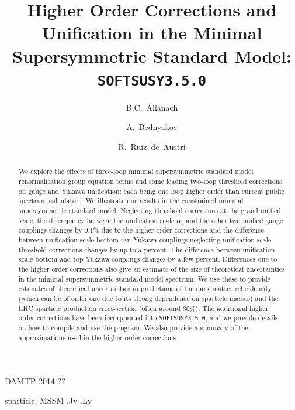\documentclass[final,3p,times,pdflatex]{elsarticle}
\begin{document}
\begin{frontmatter}

\begin{flushright}
DAMTP-2014-??
\end{flushright}

\title{Higher Order Corrections and Unification in
  the Minimal Supersymmetric Standard Model: {\tt SOFTSUSY3.5.0}}

\author[damtp]{B.C.~Allanach}
\author[dubna]{A.~Bednyakov}
\author[valencia]{R.~Ruiz~de~Austri}

\address[damtp]{DAMTP, CMS, University of Cambridge, Wilberforce road,
  Cambridge, CB3  0WA, United Kingdom}
\address[dubna]{Joint Institute for Nuclear Research, 141980, Dubna, Russia}
\address[valencia]{Instituto de Física Corpuscular, IFIC-UV/CSIC, E-46980
  Paterna, Spain}  

\begin{abstract}
  We explore the effects of three-loop minimal supersymmetric standard
  model   renormalisation group equation terms and some leading two-loop
  threshold corrections on gauge and Yukawa
  unification: each being one loop higher order than 
  current public spectrum calculators.
  We illustrate our results in the constrained minimal supersymmetric standard
  model. Neglecting threshold corrections at the grand unified scale, the
  discrepancy between the unification scale
  $\alpha_s$ and 
  the other two unified gauge couplings changes by 0.1$\%$ due to the
  higher order 
  corrections and
  the difference between unification scale bottom-tau
  Yukawa couplings neglecting unification scale threshold
  corrections changes by up to a percent. The difference between unification
  scale bottom and top Yukawa couplings changes by a few percent.
  Differences due to the higher order corrections also give an estimate of the
  size of theoretical uncertainties in the minimal supersymmetric standard
  model spectrum. We use these to 
  provide   estimates 
  of theoretical uncertainties in predictions of the dark matter relic density
  (which can be of order one due to its strong dependence on sparticle masses)
  and the LHC sparticle production cross-section (often around 30$\%$).
  The additional higher order corrections have been
  incorporated into {\tt SOFTSUSY3.5.0}, and we provide details on how to
  compile and use the program. We also provide a summary of the
  approximations used in the higher order corrections. 
\end{abstract}

\begin{keyword}
sparticle, 
MSSM
.Jv
.Ly
\end{keyword}
\end{frontmatter}
\end{document}

